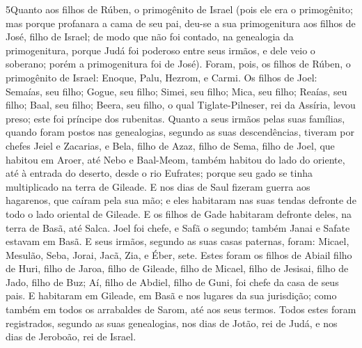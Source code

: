 \lettrine{5} Quanto aos filhos de Rúben, o primogênito de
Israel (pois ele era o primogênito; mas porque profanara a cama de
seu pai, deu-se a sua primogenitura aos filhos de José, filho de
Israel; de modo que não foi contado, na genealogia da primogenitura,
porque Judá foi poderoso entre seus irmãos, e dele veio o
soberano; porém a primogenitura foi de José). Foram, pois, os
filhos de Rúben, o primogênito de Israel: Enoque, Palu, Hezrom, e
Carmi. Os filhos de Joel: Semaías, seu filho; Gogue, seu filho;
Simei, seu filho; Mica, seu filho; Reaías, seu filho; Baal, seu
filho; Beera, seu filho, o qual Tiglate-Pilneser, rei da
Assíria, levou preso; este foi príncipe dos rubenitas. Quanto a
seus irmãos pelas suas famílias, quando foram postos nas
genealogias, segundo as suas descendências, tiveram por chefes Jeiel
e Zacarias, e Bela, filho de Azaz, filho de Sema, filho de Joel,
que habitou em Aroer, até Nebo e Baal-Meom, também habitou do
lado do oriente, até à entrada do deserto, desde o rio Eufrates;
porque seu gado se tinha multiplicado na terra de Gileade. E
nos dias de Saul fizeram guerra aos hagarenos, que caíram pela sua
mão; e eles habitaram nas suas tendas defronte de todo o lado
oriental de Gileade. E os filhos de Gade habitaram defronte
deles, na terra de Basã, até Salca. Joel foi chefe, e Safã o
segundo; também Janai e Safate estavam em Basã. E seus
irmãos, segundo as suas casas paternas, foram: Micael, Mesulão,
Seba, Jorai, Jacã, Zia, e Éber, sete. Estes foram os filhos
de Abiail filho de Huri, filho de Jaroa, filho de Gileade, filho de
Micael, filho de Jesisai, filho de Jado, filho de Buz; Aí,
filho de Abdiel, filho de Guni, foi chefe da casa de seus pais.
E habitaram em Gileade, em Basã e nos lugares da sua
jurisdição; como também em todos os arrabaldes de Sarom, até aos
seus termos. Todos estes foram registrados, segundo as suas
genealogias, nos dias de Jotão, rei de Judá, e nos dias de Jeroboão,
rei de Israel.

